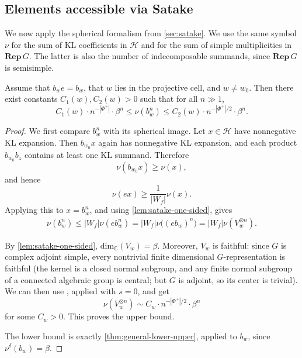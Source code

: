 \documentclass[a4paper,11pt]{amsart}
\newcommand{\C}{\mathbb{C}}
\renewcommand{\dim}[1][\C]{\mathrm{dim}_{#1}}
\newcommand{\Hecke}{\mc H}
\newcommand{\Rep}{\mathbf{Rep}\,}
\newcommand{\mc}{\mathcal}
\numberwithin{equation}{subsection}
\theoremstyle{definition}
\theoremstyle{remark}
\begin{document}
\subsection{Elements accessible via Satake}\label{sec:generalpower}

We now apply the spherical formalism from \autoref{sec:satake}. We use the
same symbol \(\nu\) for the sum of KL coefficients in $\Hecke$ and for the sum
of simple multiplicities in \(\Rep G\). The latter is also the number of
indecomposable summands, since $\Rep G$ is semisimple.

\begin{Theorem}\label{prop:satake-bounds}
Assume that \(b_we=b_w\), that \(w\) lies in the projective cell, and $w\neq w_0$.
Then there exist constants \(C_1(w),C_2(w)>0\) such that for all \(n\gg 1\),
\[
C_1(w)\cdot n^{-|\Phi^+|}\cdot\beta^n
\leq
\nu(b_w^n)
\leq
C_2(w)\cdot n^{-|\Phi^+|/2}\cdot\beta^n .
\]
\end{Theorem}
\begin{proof}
We first compare \(b_w^n\) with its spherical image. Let \(x\in \Hecke\) have
nonnegative KL expansion. Then \(b_{w_0}x\) again has nonnegative KL
expansion, and each product \(b_{w_0}b_z\) contains at least one KL summand.
Therefore
\[
\nu(b_{w_0}x)\geq \nu(x),
\]
and hence
\[
\nu(ex)\geq \frac{1}{|W_f|}\nu(x).
\]
Applying this to \(x=b_w^n\), and using
\autoref{lem:satake-one-sided}, gives
\begin{gather}\label{eq:one-sided-satake-comparison}
\nu(b_w^n)
\leq
|W_f|\nu(eb_w^n)
=
|W_f|\nu\bigl((eb_w)^n\bigr)
=
|W_f|\nu(V_w^{\otimes n}).
\end{gather}

By \autoref{lem:satake-one-sided}, \(\dim(V_w)=\beta\). 
Moreover, $V_w$ is faithful: since \(G\) is complex adjoint simple, every nontrivial finite dimensional
\(G\)-representation is faithful (the kernel is a closed normal subgroup, and
any finite normal subgroup of a connected algebraic group is central; but
\(G\) is adjoint, so its center is trivial). We can then use
\cite[Theorem 2.5]{CEO19}, applied with \(s=0\), and get
\[
\nu(V_w^{\otimes n})
\sim
C_w\cdot n^{-|\Phi^+|/2}\cdot \beta^n
\]
for some \(C_w>0\). This proves the upper bound.

The lower bound is exactly \autoref{thm:general-lower-upper}, applied to
\(b_w\), since \(\nu^\delta(b_w)=\beta\).
\end{proof}
\end{document}
